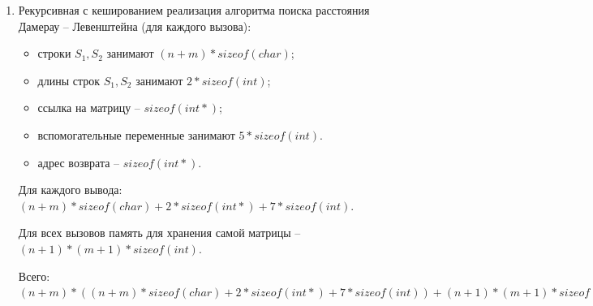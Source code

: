 \begin{enumerate}[label={\arabic*)}]
    \item Рекурсивная с кешированием реализация алгоритма поиска расстояния Дамерау -- Левенштейна (для каждого вызова):
    
         \begin{itemize}
        \item строки $S_1, S_2$ занимают $(n + m) * sizeof(char)$;
        \item длины строк $S_1, S_2$ занимают $2 * sizeof(int)$;
        \item ссылка на матрицу -- $sizeof(int*)$;
        \item вспомогательные переменные занимают $5 * sizeof(int)$.
        \item адрес возврата -- $sizeof(int*)$.
    \end{itemize}
   Для каждого вывода: $(n + m) * sizeof(char) + 2 * sizeof(int*) + 7 * sizeof(int)$.
   
   Для всех вызовов память для хранения самой матрицы -- $(n + 1) *(m + 1) * sizeof(int)$.
   
    Всего: $(n + m) *((n + m) * sizeof(char) + 2 * sizeof(int*) + 7 * sizeof(int)) + (n + 1) *(m + 1) * sizeof(int)$ 
    
   
\end{enumerate}

